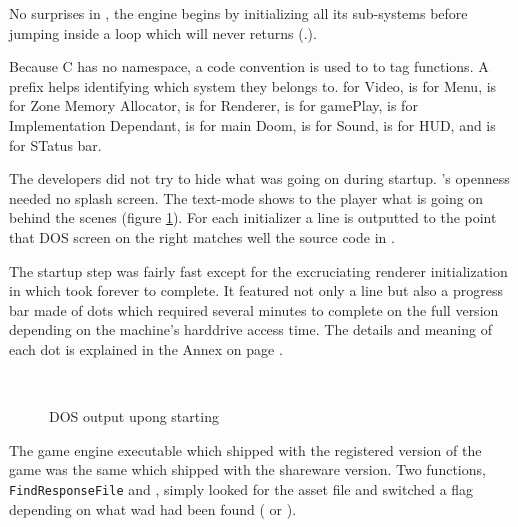 \par
{}
\par
No surprises in , the engine begins by initializing all its sub-systems before jumping inside a loop which will never returns (.).\\
\par
Because C has no namespace, a code convention is used to to tag functions. A prefix helps identifying which system they belongs to.  for Video,  is for Menu,  is for Zone Memory Allocator,  is for Renderer,  is for gamePlay,  is for Implementation Dependant,  is for main Doom,  is for Sound,  is for HUD, and  is for STatus bar.\\
\par
The developers did not try to hide what was going on during startup. \doom's openness needed no splash screen. The text-mode shows to the player what is going on behind the scenes (figure \ref{dosloading}). For each initializer a line is outputted to the point that DOS screen on the right matches well the source code in .\\
\par
The startup step was fairly fast except for the excruciating renderer initialization in  which took forever to complete. It featured not only a line but also a progress bar made of dots which required several minutes to complete on the full version depending on the machine's harddrive access time. The details and meaning of each dot is explained in the Annex on page \pageref{dots_explained}.\\
\par
{}\\
\par
\begin{figure}[H]
\label{dosloading}
\caption{DOS output upong starting }
\end{figure}

\par
The game engine executable which shipped with the registered version of the game was the same which shipped with the shareware version. Two functions, \texttt{\justify FindResponseFile} and , simply looked for the asset file and switched a flag depending on what wad had been found ( or ).\\
\par
{}





